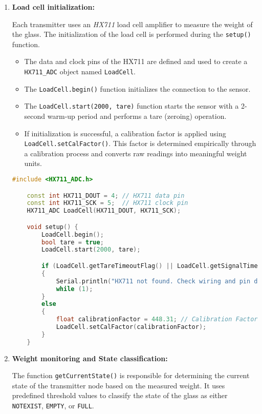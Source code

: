 \begin{enumerate}
    \item \textbf{Load cell initialization:}{
    Each transmitter uses an \textit{HX711} load cell amplifier to measure the weight of the glass. 
    The initialization of the load cell is performed during the \texttt{setup()} function.
    \begin{itemize}
        \item The data and clock pins of the HX711 are defined and used to create a \texttt{HX711\_ADC} object named \texttt{LoadCell}.
        \item The \texttt{LoadCell.begin()} function initializes the connection to the sensor.
        \item The \texttt{LoadCell.start(2000, tare)} function starts the sensor with a 2-second warm-up period and performs a tare (zeroing) operation.
        \item If initialization is successful, a calibration factor is applied using \texttt{LoadCell.setCalFactor()}. This factor is determined empirically through a calibration process and converts raw readings into meaningful weight units.
    \end{itemize}


    \begin{lstlisting}[language=C++, caption={Load cell initialization}]
    #include <HX711_ADC.h>

    const int HX711_DOUT = 4; // HX711 data pin
    const int HX711_SCK = 5;  // HX711 clock pin
    HX711_ADC LoadCell(HX711_DOUT, HX711_SCK);

    void setup() {
        LoadCell.begin();
        bool tare = true;
        LoadCell.start(2000, tare);

        if (LoadCell.getTareTimeoutFlag() || LoadCell.getSignalTimeoutFlag())
        {
            Serial.println("HX711 not found. Check wiring and pin designations.");
            while (1);
        }
        else
        {
            float calibrationFactor = 448.31; // Calibration Factor
            LoadCell.setCalFactor(calibrationFactor);
        }
    }
    \end{lstlisting}}

    \item \textbf{Weight monitoring and State classification:}{
    The function \texttt{getCurrentState()} is responsible for determining the current state of the transmitter node based on the measured weight. 
    It uses predefined threshold values to classify the state of the glass as either \texttt{NOTEXIST}, \texttt{EMPTY}, or \texttt{FULL}.

}
\end{enumerate}
